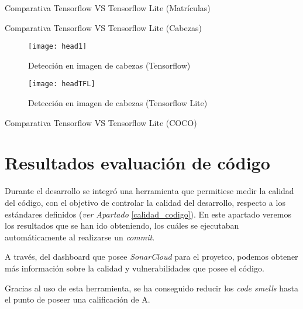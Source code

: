\clearpage

Comparativa Tensorflow VS Tensorflow Lite (Matrículas)

\clearpage

Comparativa Tensorflow VS Tensorflow Lite (Cabezas)
\begin{figure}[!h]
    \centering
    \texttt{[image: head1]}
    \caption{Detección en imagen de cabezas (Tensorflow)}\label{fig:head1}
\end{figure}
\begin{figure}[!h]
    \centering
    \texttt{[image: headTFL]}
    \caption{Detección en imagen de cabezas (Tensorflow Lite)}\label{fig:headTFL}
\end{figure}

\clearpage

Comparativa Tensorflow VS Tensorflow Lite (COCO)

\clearpage

\section{Resultados evaluación de código} 
Durante el desarrollo se integró una herramienta que permitiese medir la calidad del código, con el objetivo de controlar la calidad del desarrollo, respecto a los estándares definidos (\textit{ver Apartado }\ref{calidad_codigo}).
En este apartado veremos los resultados que se han ido obteniendo, los cuáles se ejecutaban automáticamente al realizarse un \textit{commit}.


A través, del dashboard que posee \textit{SonarCloud} para el proyetco, podemos obtener más información sobre la calidad y vulnerabilidades que posee el código.

 \label{dashboard}


Gracias al uso de esta herramienta, se ha conseguido reducir los \textit{code smells} hasta el punto de poseer una calificación de A.

